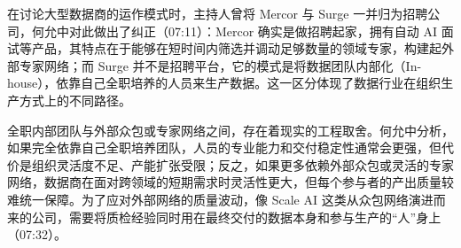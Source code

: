 \documentclass[UTF8,a4paper,11pt,fontset=fandol]{ctexart}
\begin{document}
在讨论大型数据商的运作模式时，主持人曾将 Mercor 与 Surge 一并归为招聘公司，何允中对此做出了纠正（07:11）：Mercor 确实是做招聘起家，拥有自动 AI 面试等产品，其特点在于能够在短时间内筛选并调动足够数量的领域专家，构建起外部专家网络；而 Surge 并不是招聘平台，它的模式是将数据团队内部化（In-house），依靠自己全职培养的人员来生产数据。这一区分体现了数据行业在组织生产方式上的不同路径。

全职内部团队与外部众包或专家网络之间，存在着现实的工程取舍。何允中分析，如果完全依靠自己全职培养团队，人员的专业能力和交付稳定性通常会更强，但代价是组织灵活度不足、产能扩张受限；反之，如果更多依赖外部众包或灵活的专家网络，数据商在面对跨领域的短期需求时灵活性更大，但每个参与者的产出质量较难统一保障。为了应对外部网络的质量波动，像 Scale AI 这类从众包网络演进而来的公司，需要将质检经验同时用在最终交付的数据本身和参与生产的“人”身上（07:32）。
\end{document}
